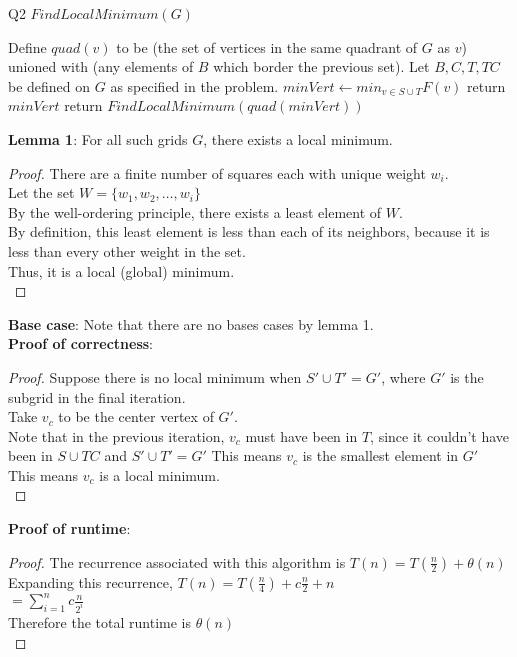 \begin{problem}
  {Q2}
  $FindLocalMinimum(G)$
  \begin{algorithmic}[1]
    \STATE Define $quad(v)$ to be (the set of vertices in the same quadrant of $G$ as $v$) unioned with (any elements of $B$ which border the previous set).
    \STATE Let $B, C, T, TC$ be defined on $G$ as specified in the problem.
    \STATE $minVert \leftarrow min_{v \in S \cup T} F(v)$
    \STATE return $minVert$
    \ELSE
    \STATE return $FindLocalMinimum(quad(minVert))$
    \ENDIF
  \end{algorithmic}
  \noindent
  \textbf{Lemma 1}: For all such grids $G$, there exists a local minimum.
  \begin{proof}
    There are a finite number of squares each with unique weight $w_i$. \\
    Let the set $W = \{w_1, w_2, \dots, w_i\}$ \\
    By the well-ordering principle, there exists a least element of $W$. \\
    By definition, this least element is less than each of its neighbors, because it is less than every other weight in the set. \\
    Thus, it is a local (global) minimum. \\
  \end{proof}
  \noindent
  \textbf{Base case}: Note that there are no bases cases by lemma 1. \\
  \noindent
  \textbf{Proof of correctness}:
  \begin{proof}
      Suppose there is no local minimum when $S' \cup T' = G'$, where $G'$ is the subgrid in the final iteration. \\
      Take $v_c$ to be the center vertex of $G'$. \\
      Note that in the previous iteration, $v_c$ must have been in $T$, since it couldn't have been in $S \cup TC$ and $S' \cup T' = G'$
      This means $v_c$ is the smallest element in $G'$ \\
      This means $v_c$ is a local minimum. \\
  \end{proof}
  \noindent
  \textbf{Proof of runtime}:
  \begin{proof}
    The recurrence associated with this algorithm is $T(n) = T(\frac{n}{2}) + \theta(n)$ \\
    Expanding this recurrence, $T(n) = T(\frac{n}{4}) + c\frac{n}{2} + n$ \\
    $= \sum_{i = 1}^{n} c\frac{n}{2^i}$ \\
    Therefore the total runtime is $\theta(n)$ \\
  \end{proof}
\end{problem}
